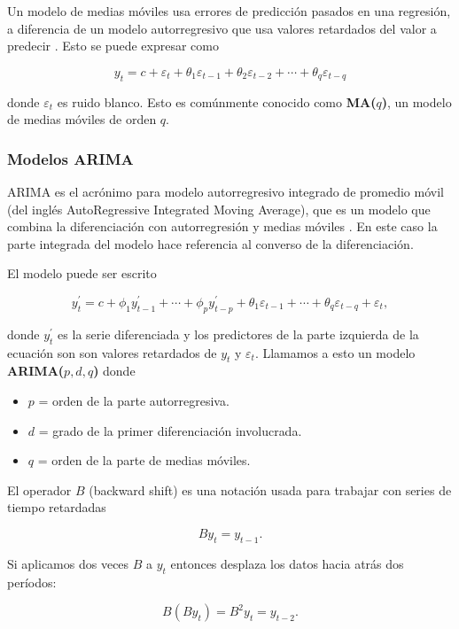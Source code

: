 Un modelo de medias móviles usa errores de predicción pasados en una regresión, a diferencia de un modelo autorregresivo que usa valores retardados del valor a predecir \cite{hyndmanForecastingPrinciplesPractice}. Esto se puede expresar como

\[ y_{t}=c+\varepsilon_{t}+\theta_{1} \varepsilon_{t-1}+\theta_{2} \varepsilon_{t-2}+\cdots+\theta_{q} \varepsilon_{t-q} \]

donde $\varepsilon_{t}$ es ruido blanco. Esto es comúnmente conocido como \textbf{MA($q$)}, un modelo de medias móviles de orden $q$.

\subsubsection{Modelos ARIMA}

ARIMA es el acrónimo para modelo autorregresivo integrado de promedio móvil (del inglés AutoRegressive Integrated Moving Average), que es un modelo que combina la diferenciación con autorregresión y medias móviles \cite{hyndmanForecastingPrinciplesPractice}. En este caso la parte integrada del modelo hace referencia al converso de la diferenciación. 

El modelo puede ser escrito 

\[ y_{t}^{\prime}=c+\phi_{1} y_{t-1}^{\prime}+\cdots+\phi_{p} y_{t-p}^{\prime}+\theta_{1} \varepsilon_{t-1}+\cdots+\theta_{q} \varepsilon_{t-q}+\varepsilon_{t}, \]

donde $y_{t}^{\prime}$ es la serie diferenciada y los predictores de la parte izquierda de la ecuación son son valores retardados de $y_t$ y $\varepsilon_t$. Llamamos a esto un modelo \textbf{ARIMA($p,d,q$)} donde

\begin{itemize}
\item $p$ = orden de la parte autorregresiva.
\item $d$ = grado de la primer diferenciación involucrada.
\item $q$ = orden de la parte de medias móviles.
\end{itemize}

El operador $B$ (backward shift) es una notación usada para trabajar con series de tiempo retardadas

\[ B y_{t}=y_{t-1}. \]

Si aplicamos dos veces $B$ a $y_t$ entonces desplaza los datos hacia atrás dos períodos: 

\[B\left(B y_{t}\right)=B^{2} y_{t}=y_{t-2}.\]

